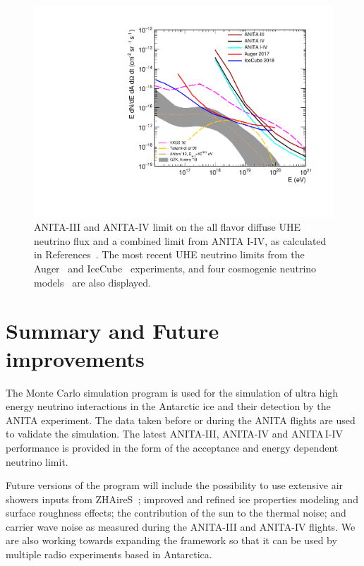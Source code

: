 \begin{figure}[!h]\centering
 \includegraphics[width=.65\linewidth]{./Figs/Limit4icemcPaper.pdf}
 \caption{
 ANITA-III and ANITA-IV limit on the all flavor diffuse UHE neutrino flux and a combined limit from ANITA I-IV, as calculated in References~\cite{anita3cosmogenic,anita4cosmogenic}.
 The most recent UHE neutrino limits
from the Auger~\cite{auger2017} and IceCube~\cite{icecube2018} experiments, and
four cosmogenic neutrino models~\cite{kkss2002,takami2009,ahlers2012,kotera2010cosmogenic} are also displayed. 
}
 \label{fig:sensitivity}
\end{figure}

\section{Summary and Future improvements}
\label{sec:future}
The \icemc Monte Carlo simulation program is used for the
simulation of ultra high energy neutrino interactions in the Antarctic
ice and their detection by the ANITA experiment.
The data taken before or during the ANITA flights are used to validate the
simulation.
The latest ANITA-III, ANITA-IV and ANITA\,I-IV performance is provided in the form of the
acceptance and energy dependent neutrino limit.
 
Future versions of the program will include the possibility to use extensive air showers inputs from ZHAireS~\cite{alvarez2012monte}; improved and refined ice properties modeling and surface roughness effects; the contribution of the sun to the thermal noise; and carrier wave noise as measured during the ANITA-III and ANITA-IV flights.
We are also working towards expanding the framework so that it can be used by multiple radio experiments based in Antarctica.
